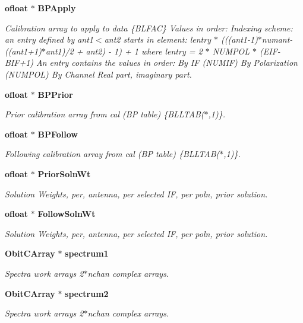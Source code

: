 \begin{CompactItemize}
{\bf ofloat} $\ast$ {\bf BPApply}
\begin{CompactList}\small\item\em Calibration array to apply to data \{BLFAC\} Values in order: Indexing scheme: an entry defined by ant1$<$ant2 starts in element: lentry $\ast$ (((ant1-1)$\ast$numant-((ant1+1)$\ast$ant1)/2 + ant2) - 1) + 1 where lentry = 2 $\ast$ NUMPOL $\ast$ (EIF-BIF+1) An entry contains the values in order: By IF (NUMIF) By Polarization (NUMPOL) By Channel Real part, imaginary part. \item\end{CompactList}\item 
{\bf ofloat} $\ast$ {\bf BPPrior}
\begin{CompactList}\small\item\em Prior calibration array from cal (BP table) \{BLLTAB($\ast$,1)\}. \item\end{CompactList}\item 
{\bf ofloat} $\ast$ {\bf BPFollow}
\begin{CompactList}\small\item\em Following calibration array from cal (BP table) \{BLLTAB($\ast$,1)\}. \item\end{CompactList}\item 
{\bf ofloat} $\ast$ {\bf Prior\-Soln\-Wt}
\begin{CompactList}\small\item\em Solution Weights, per, antenna, per selected IF, per poln, prior solution. \item\end{CompactList}\item 
{\bf ofloat} $\ast$ {\bf Follow\-Soln\-Wt}
\begin{CompactList}\small\item\em Solution Weights, per, antenna, per selected IF, per poln, prior solution. \item\end{CompactList}\item 
{\bf Obit\-CArray} $\ast$ {\bf spectrum1}
\begin{CompactList}\small\item\em Spectra work arrays 2$\ast$nchan complex arrays. \item\end{CompactList}\item 
{\bf Obit\-CArray} $\ast$ {\bf spectrum2}
\begin{CompactList}\small\item\em Spectra work arrays 2$\ast$nchan complex arrays. \item\end{CompactList}\item 

\end{CompactItemize}

